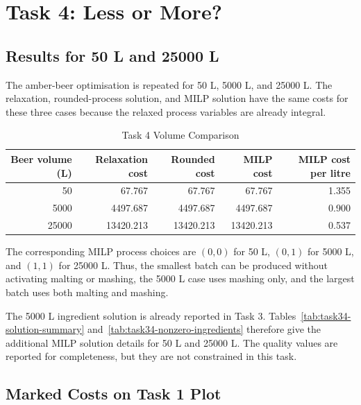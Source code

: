 \section{Task 4: Less or More?}
\label{sec:task4}

\subsection{Results for 50 L and 25000 L}
\label{sec:task4-results}

The amber-beer optimisation is repeated for 50 L, 5000 L, and 25000 L. The relaxation, rounded-process solution, and MILP solution have the same costs for these three cases because the relaxed process variables are already integral.

\begin{table}[H]
\renewcommand{\arraystretch}{1.15}
\caption{Task 4 Volume Comparison}
\label{tab:task34-volume-comparison}
\centering
\small
\begin{tabular}{@{}rrrrr@{}}
\toprule
Beer volume (L) & Relaxation cost & Rounded cost & MILP cost & MILP cost per litre \\
\midrule
50 & 67.767 & 67.767 & 67.767 & 1.355 \\
5000 & 4497.687 & 4497.687 & 4497.687 & 0.900 \\
25000 & 13420.213 & 13420.213 & 13420.213 & 0.537 \\
\bottomrule
\end{tabular}
\end{table}

The corresponding MILP process choices are $(0,0)$ for 50 L, $(0,1)$ for 5000 L, and $(1,1)$ for 25000 L. Thus, the smallest batch can be produced without activating malting or mashing, the 5000 L case uses mashing only, and the largest batch uses both malting and mashing.

The 5000 L ingredient solution is already reported in Task 3. Tables~\ref{tab:task34-solution-summary} and~\ref{tab:task34-nonzero-ingredients} therefore give the additional MILP solution details for 50 L and 25000 L. The quality values are reported for completeness, but they are not constrained in this task.





\subsection{Marked Costs on Task 1 Plot}
\label{sec:task4-marked-plot}

